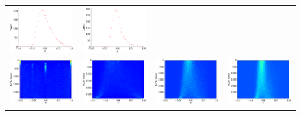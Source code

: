 \documentclass[senior,final,11pt]{iscs-thesis}
\begin{document}
\begin{figure}[htbp]
\begin{tabular}{cccc}
    \includegraphics[width=45mm]{figure/random_geometric_graph_n3000_radius065_dim10txt_dos.png} &
    \includegraphics[width=45mm]{figure/random_geometric_graph_n3000_radius07_dim10txt_dos.png} \\
    \includegraphics[width=45mm]{figure/random_geometric_graph_n3000_radius05_dim10txt_pdos.png} &
    \includegraphics[width=45mm]{figure/random_geometric_graph_n3000_radius055_dim10txt_pdos.png} &
    \includegraphics[width=45mm]{figure/random_geometric_graph_n3000_radius065_dim10txt_pdos.png} &
    \includegraphics[width=45mm]{figure/random_geometric_graph_n3000_radius07_dim10txt_pdos.png} \\

\end{tabular}
\end{figure}
\end{document}

